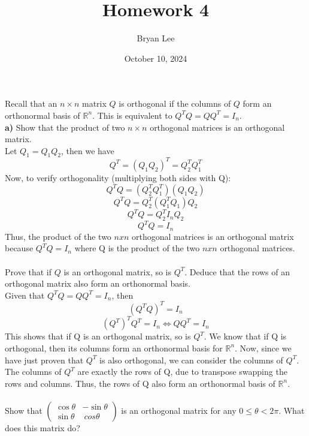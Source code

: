 \documentclass{article}
\title{Homework 4}
\author{Bryan Lee}
\date{October 10, 2024}
\begin{document}
\maketitle

 Recall that an $n \times n$ matrix $Q$ is orthogonal if the
columns of $Q$ form an orthonormal basis of $\mathbb{R}^n$. This is equivalent to
$Q^TQ = QQ^T = I_n$. \\
{\bf a)} Show that the product of two $n \times n$ orthogonal matrices is an
orthogonal matrix. \\

\noindent Let $Q_1 = Q_1Q_2$, then we have
\[
Q^T = (Q_1Q_2)^T = Q_2^TQ_1^T
\]
Now, to verify orthogonality (multiplying both sides with Q):\\
\[
Q^TQ = (Q_2^TQ_1^T)(Q_1Q_2)
\]
\[
Q^TQ = Q_2^T(Q_1^TQ_1)Q_2
\]
\[
Q^TQ = Q_2^TI_nQ_2
\]
\[
Q^TQ = I_n
\]
Thus, the product of the two $nxn$ orthogonal matrices is an orthogonal matrix because $Q^TQ = I_n$ where Q is the product of the two $nxn$ orthogonal matrices.\\\\

 Prove that if $Q$ is an orthogonal matrix, so is $Q^T$. Deduce that the
rows of an orthogonal matrix also form an orthonormal basis. \\

\noindent Given that $Q^TQ = QQ^T = I_n$, then
\[
(Q^TQ)^T = I_n
\]
\[
(Q^T)^TQ^T = I_n \Leftrightarrow QQ^T = I_n
\]
This shows that if Q is an orthogonal matrix, so is $Q^T$. We know that if Q is orthogonal, then its columns form an orthonormal basis for $\mathbb{R}^n$. Now, since we have just proven that $Q^T$ is also orthogonal, we can consider the columns of $Q^T$. The columns of $Q^T$ are exactly the rows of Q, due to transpose swapping the rows and columns. Thus, the rows of Q also form an orthonormal basis of $\mathbb{R}^n$.\\\\

 Show that $\begin{pmatrix} \cos \theta & - \sin \theta \\ \sin \theta & \
cos \theta \end{pmatrix}$ is an orthogonal matrix for any $0 \leq \theta < 2\pi$.
What does this matrix do? \\
\end{document}
